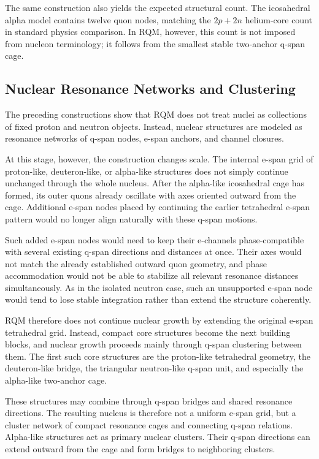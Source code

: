 \documentclass[11pt,a4paper]{article}
\begin{document}
The same construction also yields the expected structural count. The icosahedral alpha model contains twelve quon nodes, matching the \(2p+2n\) helium-core count in standard physics comparison. In RQM, however, this count is not imposed from nucleon terminology; it follows from the smallest stable two-anchor q-span cage.


\subsection{Nuclear Resonance Networks and Clustering}

The preceding constructions show that RQM does not treat nuclei as collections of fixed proton and neutron objects. Instead, nuclear structures are modeled as resonance networks of q-span nodes, e-span anchors, and channel closures.

At this stage, however, the construction changes scale. The internal e-span grid of proton-like, deuteron-like, or alpha-like structures does not simply continue unchanged through the whole nucleus. After the alpha-like icosahedral cage has formed, its outer quons already oscillate with axes oriented outward from the cage. Additional e-span nodes placed by continuing the earlier tetrahedral e-span pattern would no longer align naturally with these q-span motions.

Such added e-span nodes would need to keep their e-channels phase-compatible with several existing q-span directions and distances at once. Their axes would not match the already established outward quon geometry, and phase accommodation would not be able to stabilize all relevant resonance distances simultaneously. As in the isolated neutron case, such an unsupported e-span node would tend to lose stable integration rather than extend the structure coherently.

RQM therefore does not continue nuclear growth by extending the original e-span tetrahedral grid. Instead, compact core structures become the next building blocks, and nuclear growth proceeds mainly through q-span clustering between them. The first such core structures are the proton-like tetrahedral geometry, the deuteron-like bridge, the triangular neutron-like q-span unit, and especially the alpha-like two-anchor cage.

These structures may combine through q-span bridges and shared resonance directions. The resulting nucleus is therefore not a uniform e-span grid, but a cluster network of compact resonance cages and connecting q-span relations. Alpha-like structures act as primary nuclear clusters. Their q-span directions can extend outward from the cage and form bridges to neighboring clusters.
\end{document}
